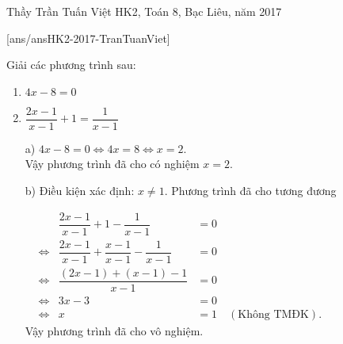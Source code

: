 \begin{name}
{Thầy  Trần Tuấn Việt}
{HK2, Toán 8, Bạc Liêu, năm 2017}
\end{name}
\setcounter{ex}{0}
[ans/ansHK2-2017-TranTuanViet]


\begin{ex}%
Giải các phương trình sau: 
\hfill
    \begin{enumerate}    
        \item $4x - 8 = 0$
        \item $\dfrac{2x - 1}{x - 1} + 1 = \dfrac{1}{x - 1}$
    \end{enumerate}
\loigiai
    {
    \begin{enumerate}
        \item[a)] $4x - 8 = 0 \Leftrightarrow 4x = 8 \Leftrightarrow x = 2$.\\
        Vậy phương trình đã cho có nghiệm $x = 2$.
        \item[b)] Điều kiện xác định: $x \neq 1$.
Phương trình đã cho tương đương\medskip

        $\begin{aligned}
        && \dfrac{2x - 1}{x - 1} + 1 - \dfrac{1}{x - 1} & = 0\\
        &\Leftrightarrow & \dfrac{2x - 1}{x - 1} + \dfrac{x - 1}{x - 1} - \dfrac{1}{x - 1} & = 0\\
        &\Leftrightarrow & \dfrac{(2x - 1) + (x - 1) - 1}{x - 1} & = 0\\
        & \Leftrightarrow & 3x - 3 & = 0\\
        & \Leftrightarrow & x & = 1 \quad (\text{Không TMĐK}).
        \end{aligned}$\\
        Vậy phương trình đã cho vô nghiệm.
    \end{enumerate}}
\end{ex}

